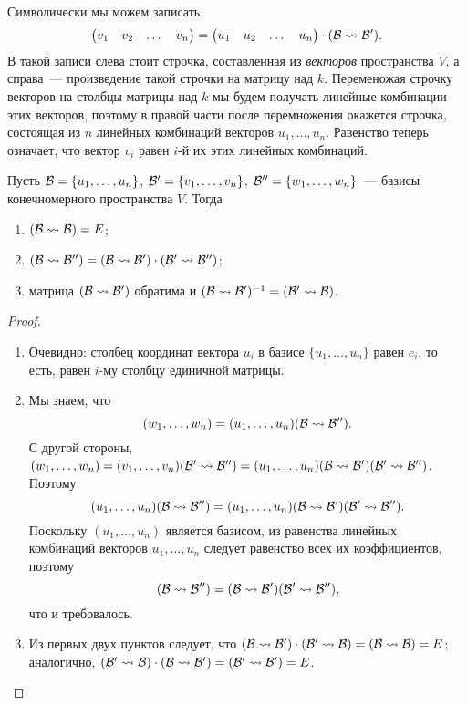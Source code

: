 Символически мы можем записать
$$
\begin{pmatrix}v_1 & v_2 & \dots & v_n\end{pmatrix} =
\begin{pmatrix}u_1 & u_2 & \dots & u_n\end{pmatrix}\cdot
(\mathcal B\rightsquigarrow\mathcal B').
$$
В такой записи слева стоит строчка, составленная из {\em векторов}
пространства $V$, а справа~--- произведение такой строчки на матрицу
над $k$. Переменожая строчку векторов на столбцы матрицы над $k$ мы
будем получать линейные комбинации этих векторов, поэтому в правой
части после перемножения окажется строчка, состоящая из $n$
линейных комбинаций векторов $u_1,\dots,u_n$. Равенство теперь означает,
что вектор $v_i$ равен $i$-й их этих линейных комбинаций.


\begin{proposition}
Пусть $\mathcal B=\{u_1,\dots,u_n\}$, $\mathcal B'=\{v_1,\dots,v_n\}$,
$\mathcal B''=\{w_1,\dots,w_n\}$~--- базисы конечномерного пространства
$V$. Тогда
\begin{enumerate}
\item $(\mathcal B\rightsquigarrow\mathcal B)=E$;
\item $(\mathcal B\rightsquigarrow\mathcal B'')=(\mathcal B\rightsquigarrow\mathcal B')\cdot (\mathcal B'\rightsquigarrow\mathcal B'')$;
\item матрица $(\mathcal B\rightsquigarrow\mathcal B')$ обратима и
$(\mathcal B\rightsquigarrow\mathcal B')^{-1}=(\mathcal B'\rightsquigarrow\mathcal B)$.
\end{enumerate}
\end{proposition}
\begin{proof}
\begin{enumerate}
\item Очевидно: столбец координат вектора $u_i$ в базисе
  $\{u_1,\dots,u_n\}$ равен $e_i$, то есть, равен $i$-му столбцу
  единичной матрицы.
\item Мы знаем, что $$(w_1,\dots,w_n)=(u_1,\dots,u_n)(\mathcal B\rightsquigarrow\mathcal
  B'').$$
С другой стороны, $(w_1,\dots,w_n) = (v_1,\dots,v_n)(\mathcal B'\rightsquigarrow\mathcal B'')
= (u_1,\dots,u_n)(\mathcal B\rightsquigarrow\mathcal B')(\mathcal B'\rightsquigarrow\mathcal B'')$.
Поэтому
$$
(u_1,\dots,u_n)(\mathcal B\rightsquigarrow\mathcal B'') = (u_1,\dots,u_n)(\mathcal B\rightsquigarrow\mathcal
B')(\mathcal B'\rightsquigarrow\mathcal B'').
$$
Поскольку $(u_1,\dots,u_n)$ является базисом, из равенства линейных
комбинаций векторов $u_1,\dots,u_n$ следует равенство всех их
коэффициентов, поэтому
$$
(\mathcal B\rightsquigarrow\mathcal B'') = (\mathcal B\rightsquigarrow\mathcal B')(\mathcal B'\rightsquigarrow\mathcal B''),
$$
что и требовалось.
\item Из первых двух пунктов следует, что $(\mathcal B\rightsquigarrow\mathcal B')\cdot(\mathcal
  B'\rightsquigarrow\mathcal B) = (\mathcal B\rightsquigarrow\mathcal B) = E$; аналогично, $(\mathcal B'\rightsquigarrow\mathcal
  B)\cdot(\mathcal B\rightsquigarrow\mathcal B') = (\mathcal B'\rightsquigarrow\mathcal B') = E$.
\end{enumerate}
\end{proof}

